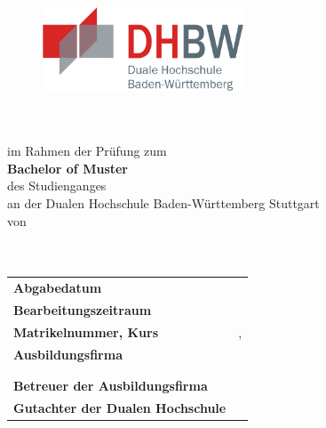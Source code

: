 \thispagestyle{empty}
\begin{titlepage}
	\enlargethispage{4cm}
	\begin{figure}
		\begin{minipage}{0.49\textwidth}
			\flushleft
		\end{minipage}
		\hfill
		\begin{minipage}{0.49\textwidth}
			\flushright
			\includegraphics[height=2.5cm]{images/logos/dhbw.png} 
		\end{minipage}
	\end{figure} 
	\vspace*{0.1cm}
	\begin{center}
		\huge{\textbf{\titel}}\\[1.5cm]
		\Large{\textbf{\arbeit}}\\[0.5cm]
		\normalsize{im Rahmen der Prüfung zum\\[1ex] \textbf{Bachelor of Muster}}\\[0.5cm]
		\Large{des Studienganges \studiengang}\\[1ex]
		\normalsize{an der Dualen Hochschule Baden-Württemberg Stuttgart}\\[1cm]
		\normalsize{von}\\[1ex] \Large{\textbf{\autor}} \\[1cm]
		\normalsize{\bearbeitungsmonat}\\[2.25cm]
		\begin{spacing}{0.8}
			\begin{tabular}{ll}
				\textbf{Abgabedatum}				\hspace{4.5cm}					& \abgabeDatum\\[0.2cm]
				\textbf{Bearbeitungszeitraum}       				&  \bearbeitungszeitraum\\[0.2cm]
				\textbf{Matrikelnummer, Kurs} 					   	&  \matrikelnr, \kurs\\[0.2cm]
				\textbf{Ausbildungsfirma}              					 &  \firmaName\\
																						& \firmaStrasse \\
																				    	& \firmaPlz\\[0.2cm]
				\textbf{Betreuer der Ausbildungsfirma}          &  \betreuerFirma\\[0.2cm]
				\textbf{Gutachter der Dualen Hochschule}    &  \betreuerDhbw\\[0.2cm]
			\end{tabular} 
		\end{spacing}
	\end{center}
\end{titlepage}
